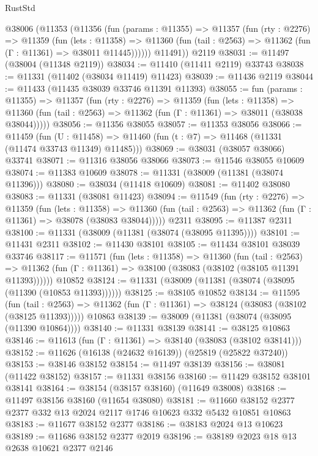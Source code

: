 \begin{lexlean}{RustStd}
\begin{coremodule}
    @38006
      (@11353
        (@11356
          (fun (params : @11355) =>
          @11357
            (fun (rty : @2276) =>
            @11359
              (fun (lets : @11358) =>
              @11360 (fun (tail : @2563) => @11362 (fun (Γ : @11361) => @38011 @11445))))))
        @11491))
    @2119
@38031 := @11497 (@38004 (@11348 @2119))
@38034 := @11410 (@11411 @2119) @33743
@38038 := @11331 (@11402 (@38034 @11419) @11423)
@38039 := @11436 @2119
@38044 := @11433 (@11435 @38039 @33746 @11391 @11393)
@38055 := fun (params : @11355) =>
  @11357
    (fun (rty : @2276) =>
    @11359
      (fun (lets : @11358) =>
      @11360 (fun (tail : @2563) => @11362 (fun (Γ : @11361) => @38011 (@38038 @38044)))))
@38056 := @11356 @38055
@38057 := @11353 @38056
@38066 := @11459
    (fun (U : @11458) => @11460 (fun (t : @7) => @11468 (@11331 (@11474 @33743 @11349) @11485)))
@38069 := @38031 (@38057 @38066) @33741
@38071 := @11316 @38056 @38066
@38073 := @11546 @38055 @10609
@38074 := @11383 @10609
@38078 := @11331 (@38009 (@11381 (@38074 @11396)))
@38080 := @38034 (@11418 @10609)
@38081 := @11402 @38080
@38083 := @11331 (@38081 @11423)
@38094 := @11549
    (fun (rty : @2276) =>
    @11359
      (fun (lets : @11358) =>
      @11360 (fun (tail : @2563) => @11362 (fun (Γ : @11361) => @38078 (@38083 @38044)))))
    @2311
@38095 := @11387 @2311
@38100 := @11331 (@38009 (@11381 (@38074 (@38095 @11395))))
@38101 := @11431 @2311
@38102 := @11430 @38101
@38105 := @11434 @38101 @38039 @33746
@38117 := @11571
    (fun (lets : @11358) =>
    @11360
      (fun (tail : @2563) =>
      @11362 (fun (Γ : @11361) => @38100 (@38083 (@38102 (@38105 @11391 @11393))))))
    @10852
@38124 := @11331 (@38009 (@11381 (@38074 (@38095 (@11390 (@10853 @11393))))))
@38125 := @38105 @10852
@38134 := @11595
    (fun (tail : @2563) => @11362 (fun (Γ : @11361) => @38124 (@38083 (@38102 (@38125 @11393)))))
    @10863
@38139 := @38009 (@11381 (@38074 (@38095 (@11390 @10864))))
@38140 := @11331 @38139
@38141 := @38125 @10863
@38146 := @11613 (fun (Γ : @11361) => @38140 (@38083 (@38102 @38141)))
@38152 := @11626 (@16138 (@24632 @16139)) (@25819 (@25822 @37240))
@38153 := @38146 @38152
@38154 := @11497 @38139
@38156 := @38081 (@11422 @38152)
@38157 := @11331 @38156
@38160 := @11429 @38152 @38101 @38141
@38164 := @38154 (@38157 @38160) (@11649 @38008)
@38168 := @11497 @38156 @38160 (@11654 @38080)
@38181 := @11660 @38152 @2377 @2377 @332 @13 @2024 @2117 @1746 @10623 @332 @5432 @10851 @10863
@38183 := @11677 @38152 @2377
@38186 := @38183 @2024 @13 @10623
@38189 := @11686 @38152 @2377 @2019
@38196 := @38189 @2023 @18 @13 @2638 @10621 @2377 @2146

\end{coremodule}
\end{lexlean}
